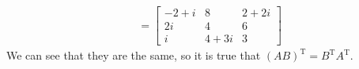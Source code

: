 \documentclass[11pt]{article}
\begin{document}
\begin{enumerate}[label=\textbf{\arabic*.}, start=4]
{\begin{enumerate}[label=\textbf{(\alph*)}]
{\begin{align*}
                                &=\begin{bmatrix}-2+i & 8 & 2+2i \\ 2i & 4 & 6 \\ i & 4+3i & 3\end{bmatrix}
                        \end{align*}
                        We can see that they are the same, so it is true that \((AB)^\mathrm{T}=B^\mathrm{T}A^\mathrm{T}\).
                    }
                \end{enumerate}
        }
    \end{enumerate}
\end{document}
